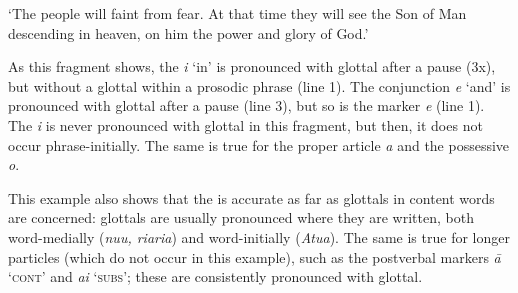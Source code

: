 \glt
‘The people will faint from fear. At that time they will see the Son of Man descending in heaven, on him the power and glory of God.’ \textstyleExampleref{[R630-13.010]}
\z

As this fragment shows, the  \textit{{\ꞌ}i} ‘in’ is pronounced with glottal after a pause (3x), but without a glottal within a prosodic phrase (line 1). The conjunction \textit{{\ꞌ}e} ‘and’ is pronounced with glottal after a pause (line 3), but so is the  marker \textit{e} (line 1). The  \textit{i} is never pronounced with glottal in this fragment, but then, it does not occur phrase-initially. The same is true for the proper article \textit{a} and the possessive  \textit{o}.

This example also shows that the  is accurate as far as glottals in content words are concerned: glottals are usually pronounced where they are written, both word-medially (\textit{nu{\ꞌ}u, ri{\ꞌ}ari{\ꞌ}a}) and word-initially (\textit{{\ꞌ}Atua}). The same is true for longer particles (which do not occur in this example), such as the postverbal markers \textit{{\ꞌ}ā} ‘\textsc{cont}’ and \textit{{\ꞌ}ai} ‘\textsc{subs}’; these are consistently pronounced with glottal.

